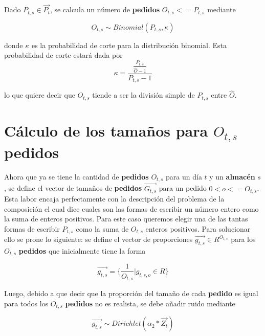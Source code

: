 Dado $P_{t,s} \in \overrightarrow{P_{t}}$, se calcula un número de \textbf{pedidos} $O_{t,s} <=  P_{t,s}$ mediante

\begin{equation}
    \label{eq:products_by_storage}
    O_{t,s} \sim Binomial(P_{t,s}, \kappa)
\end{equation}

donde $\kappa$ es la probabilidad de corte para la distribución binomial. Esta probabilidad de corte estará dada por
\begin{equation}
    \label{eq:products_by_storage}
    \kappa = \frac{\frac{P_{t,s}}{\widehat{O} - 1}}{P_{t,s} - 1}
\end{equation}

lo que quiere decir que $O_{t,s}$ tiende a ser la división simple de $P_{t,s}$ entre $\widehat{O}$.

\section{Cálculo de los tamaños para $O_{t,s}$ pedidos}

Ahora que ya se tiene la cantidad de \textbf{pedidos} $O_{t,s}$ para un día $t$ y un \textbf{almacén} $s$, se define el vector de tamaños de \textbf{pedidos} $\overrightarrow{G_{t,s}}$ para un pedido $0 < o <= O_{t,s}$. Esta labor encaja perfectamente con la descripción del problema de la composición el cual dice cuales son las formas de escribir un número entero como la suma de enteros positivos. Para este caso queremos elegir una de las tantas formas de escribir $P_{t,s}$ como la suma de $O_{t,s}$ enteros positivos. Para solucionar ello se prone lo siguiente: se define el vector de proporciones $\overrightarrow{g_{t,s}} \in R^{O_{t,s}}$ para los $O_{t,s}$  \textbf{pedidos} que inicialmente tiene la forma

\begin{equation}
    \label{eq:products_by_storage}
    \overrightarrow{g_{t,s}} = \{ \frac{1}{O_{t,s}} | g_{t,s,o} \in R \}
\end{equation}

Luego, debido a que decir que la proporción del tamaño de cada \textbf{pedido} es igual para todos los $O_{t,s}$ \textbf{pedidos} no es realista, se debe añadir ruido mediante

\begin{equation}
    \label{eq:products_by_storage}
    \overrightarrow{g_{t,s}} \sim Dirichlet(\alpha_2 * \overrightarrow{Z_t})
\end{equation}


